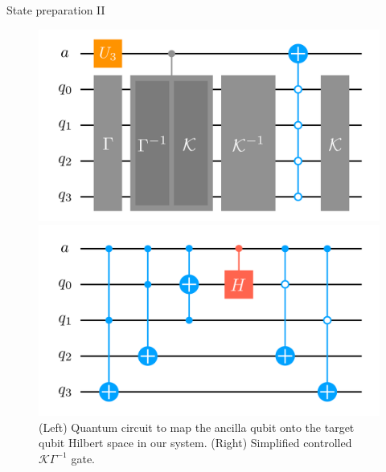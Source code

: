\documentclass[9pt, handout, aspectratio=169]{beamer}	%
\begin{document}
\begin{frame}{State preparation II}

	\begin{figure}[!p]
		\centering
		\begin{minipage}[c]{.45\linewidth}
			\centering
			\includegraphics[width=\linewidth]{Figures/NJL1-model-solving/ansatz-implementation-circuit}
		\end{minipage}
		\hspace{.025\linewidth}
		\begin{minipage}[c]{.45\linewidth}
			\centering
			\includegraphics[width=\linewidth]{Figures/NJL1-model-solving/ansatz-implementation-controlled-gammakappa}
		\end{minipage}
		\caption{(Left) Quantum circuit to map the ancilla qubit onto the target qubit Hilbert space in our system. (Right) Simplified controlled $\mathcal{K}\Gamma^{-1}$ gate.}
	\end{figure}

\end{frame}

\end{document}
